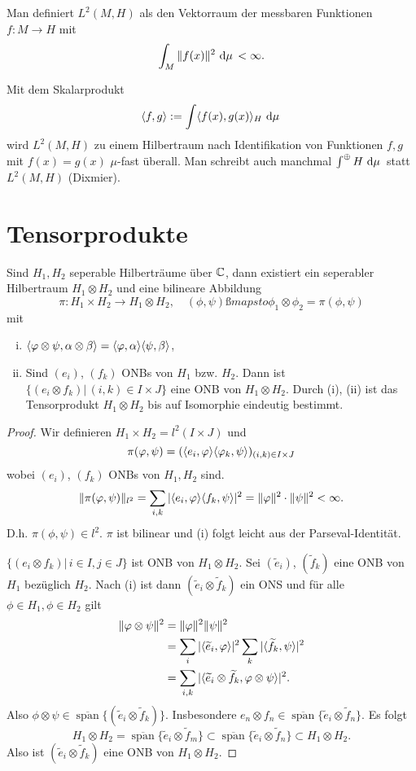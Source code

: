 \documentclass{mycourse}
\begin{document}
Man definiert $L^2(M, H)$ als den Vektorraum der messbaren Funktionen $f: M \to H$ mit 
\[
\int_M \| f(x)\|^2 \, \dx[\mu] <\infty.
\]

Mit dem Skalarprodukt
\[
\< f,g\> := \int \< f(x), g(x) \>_H \, \dx[\mu]
\]
wird $L^2(M,H)$ zu einem Hilbertraum nach Identifikation von Funktionen $f,g$ mit $f(x)=g(x)$ $\mu$-fast überall. Man schreibt auch manchmal $\int ^\oplus H \, \dx[\mu]$ statt $L^2(M, H)$ (Dixmier).

\section{Tensorprodukte}
\begin{st}
Sind $H_1, H_2$ seperable Hilberträume über $\C$, dann existiert ein seperabler Hilbertraum $H_1 \otimes H_2$ und eine bilineare Abbildung 
\[
\pi: H_1 \times H_2 \to H_1 \otimes H_2, \quad (\phi, \psi) ßmapsto \phi_1 \otimes \phi_2 = \pi(\phi, \psi)
\]
mit
\begin{enumerate}[(i)]
\item $\<\phi \otimes \psi, \alpha \otimes \beta\> = \< \phi, \alpha\> \< \psi, \beta\> $,
\item Sind $(e_i)$, $(f_k)$ ONBs von $H_1$ bzw. $H_2$. Dann ist $\{(e_i \otimes f_k) |\, (i,k) \in I\times J\}$ eine ONB von $H_1 \otimes H_2$. Durch (i), (ii) ist das Tensorprodukt $H_1 \otimes H_2$ bis auf Isomorphie eindeutig bestimmt.
\end{enumerate}
\end{st}
\begin{proof}
Wir definieren $H_1 \times H_2= l^2(I\times J)$ und 
\[
\pi(\phi, \psi) = (\<e_i, \phi \> \< \phi_k, \psi\> )_{(i,k)\in I \times J}
\]
wobei $(e_i)$, $(f_k)$ ONBs von $H_1, H_2$ sind.
\[
\| \pi(\phi, \psi) \|_{l^2} = \sum_{i,k} |\< e_i, \phi\> \< f_k, \psi\>|^2 = \|\phi\|^2 \cdot \| \psi\|^2 < \infty.
\]
D.h. $\pi(\phi,\psi)\in l^2$. $\pi$ ist bilinear und (i) folgt leicht aus der Parseval-Identität.

$\{(e_i \otimes f_k) | \, i\in I, j\in J\}$ ist ONB von $H_1 \otimes H_2$. Sei $(\tilde e_i)$, $(\tilde f_k)$ eine ONB von $H_1$ bezüglich $H_2$. Nach (i) ist dann $(\tilde e_i \otimes \tilde f_k)$ ein ONS und für alle $\phi \in H_1, \phi \in H_2$ gilt
\begin{align*}
\| \phi \otimes \psi\|^2 &= \| \phi \|^2 \|\psi\|^2\\
&= \sum_i |\<\tilde e_i, \phi\>|^2 \sum_k | \< \tilde f_k, \psi \>|^2\\
&= \sum_{i,k} |\<\tilde e_i \otimes \tilde f_k, \phi \otimes \psi\>|^2.
\end{align*}
Also $\phi \otimes \psi \in \overline{\operatorname{span}}\{(\tilde e_i \otimes \tilde f_k)\}$. Insbesondere $e_n \otimes f_n \in \overline{\operatorname{span}}\{\tilde e_i \otimes \tilde f_n\}$. Es folgt
\[
H_1 \otimes H_2 = \overline{\operatorname{span}}\{\tilde e_i \otimes \tilde f_m\} \subset \overline{\operatorname{span}} \{\tilde e_i \otimes \tilde f_n\} \subset H_1 \otimes H_2.
\]
Also ist $(\tilde e_i \otimes \tilde f_k)$ eine ONB von $H_1 \otimes H_2$.
\end{proof}
\end{document}
